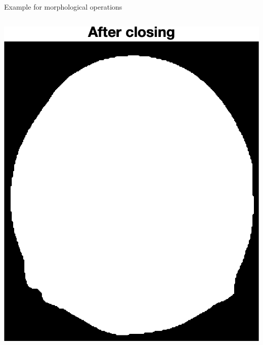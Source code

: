 \begin{frame}{Example for morphological operations}
\begin{columns}[onlytextwidth,T]
\begin{column}{0.40\textwidth}
            \includegraphics[height=0.70\textheight]{images/brain_t50_1_closed.png}
         \end{column}
     \end{columns}
\end{frame}

